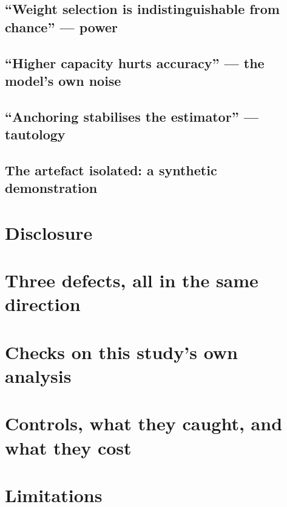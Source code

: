 \documentclass[12pt, a4paper]{article}
\begin{document}
\subsection{``Weight selection is indistinguishable from chance'' --- power}\label{sec:power}


\subsection{``Higher capacity hurts accuracy'' --- the model's own noise}\label{sec:capacity}


\subsection{``Anchoring stabilises the estimator'' --- tautology}\label{sec:tautology}


\subsection{The artefact isolated: a synthetic demonstration}\label{sec:synthetic}


\section{Disclosure}\label{sec:disclosure}


\section{Three defects, all in the same direction}\label{sec:defects}


\section{Checks on this study's own analysis}\label{sec:checks}


\section{Controls, what they caught, and what they cost}\label{sec:taxonomy}


\section{Limitations}\label{sec:limitations}

\end{document}
